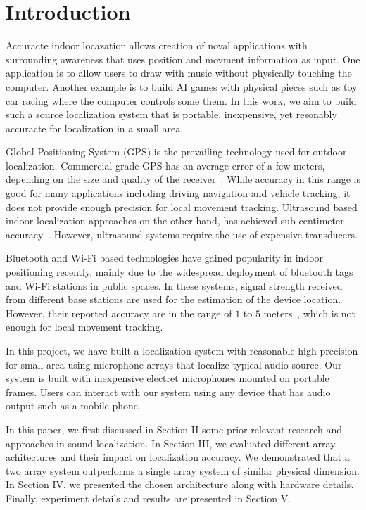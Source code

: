 \section{Introduction}


Accuracte indoor locazation allows creation of noval applications with surrounding awareness that uses position and movment information as input. One application is to allow users to draw with music without physically touching the computer. Another example is to build AI games with physical pieces such as toy car racing where the computer controls some them. In this work, we aim to build such a source localization system that is portable, inexpensive, yet resonably accuracte for localization in a small area. 

Global Positioning System (GPS) is the prevailing technology used for outdoor localization. Commercial grade GPS has an average error of a few meters, depending on the size and quality of the receiver~\cite{intro:gps}. While accuracy in this range is good for many applications including driving navigation and vehicle tracking, it does not provide enough precision for local movement tracking. Ultrasound based indoor localization approaches on the other hand, has achieved sub-centimeter accuracy~\cite{intro:ultra}. However, ultrasound systems require the use of expensive transducers.

Bluetooth and Wi-Fi based technologies have gained popularity in indoor positioning recently, mainly due to the widespread deployment of bluetooth tags and Wi-Fi stations in public spaces. In these systems, signal strength received from different base stations are used for the estimation of the device location. However, their reported accuracy are in the range of $1$ to $5$ meters~\cite{intro:blue, intro:loc}, which is not enough for local movement tracking.

In this project, we have built a localization system with reasonable high precision for small area using microphone arrays that localize typical audio source. Our system is built with inexpensive electret microphones mounted on portable frames. Users can interact with our system using any device that has audio output such as a mobile phone.

In this paper, we first discussed in Section II some prior relevant research and approaches in sound localization. In Section III, we evaluated different array achitectures and their impact on localization accuracy. We demonstrated that a two array system outperforms a single array system of similar physical dimension. In Section IV, we presented the chosen architecture along with hardware details. Finally, experiment details and results are presented in Section V.

